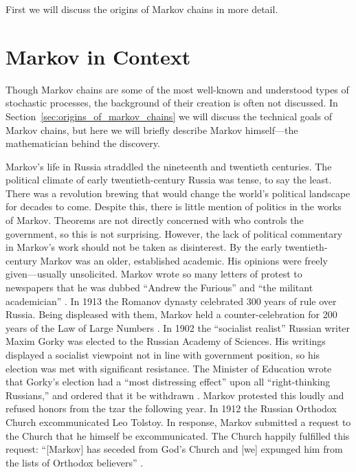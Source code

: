 \documentclass[12pt]{article}
\theoremstyle{definition}
\begin{document}
First we will discuss the origins of Markov chains in more detail.

\section{Markov in Context}
\label{sec:markov_in_context}

Though Markov chains are some of the most well-known and understood types of
stochastic processes, the background of their creation is often not discussed.
In Section~\ref{sec:origins_of_markov_chains} we will discuss the technical
goals of Markov chains, but here we will briefly describe Markov himself---the
mathematician behind the discovery.

Markov's life in Russia straddled the nineteenth and twentieth centuries. The
political climate of early twentieth-century Russia was tense, to say the
least. There was a revolution brewing that would change the world's political
landscape for decades to come. Despite this, there is little mention of
politics in the works of Markov. Theorems are not directly concerned with who
controls the government, so this is not surprising. However, the lack of
political commentary in Markov's work should not be taken as disinterest. By
the early twentieth-century Markov was an older, established academic. His
opinions were freely given---usually unsolicited. Markov wrote so many letters
of protest to newspapers that he was dubbed ``Andrew the Furious'' and ``the
militant academician'' \citep[p.~5]{basharin2004life}. In 1913 the Romanov
dynasty celebrated 300 years of rule over Russia. Being displeased with them,
Markov held a counter-celebration for 200 years of the Law of Large Numbers
\citep[chap.~10]{baclawski2008introduction}. In 1902 the ``socialist realist''
Russian writer Maxim Gorky was elected to the Russian Academy of Sciences. His
writings displayed a socialist viewpoint not in line with government position,
so his election was met with significant resistance. The Minister of Education
wrote that Gorky's election had a ``most distressing effect'' upon all
``right-thinking Russians,'' and ordered that it be withdrawn
\citep[p.~37]{yedlin1999maxim}. Markov protested this loudly and refused honors
from the tzar the following year\footnotemark. In 1912 the Russian Orthodox
Church excommunicated Leo Tolstoy. In response, Markov submitted a request to
the Church that he himself be excommunicated. The Church happily fulfilled this
request: ``[Markov] has seceded from God’s Church and [we] expunged him from
the lists of Orthodox believers'' \citep[p.~5]{basharin2004life}.
\end{document}
